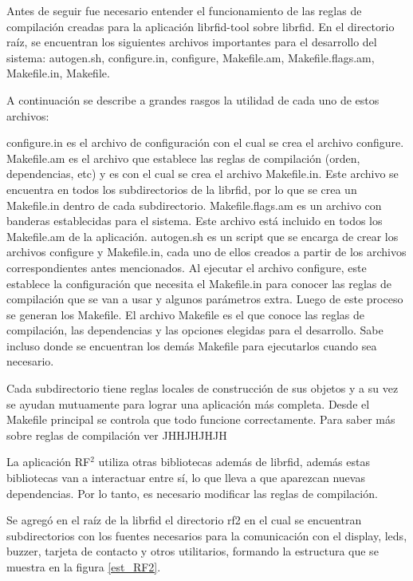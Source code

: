 \bigskip
Antes de seguir fue necesario entender el funcionamiento de las reglas de compilación creadas para la aplicación librfid-tool sobre librfid. En el directorio raíz, se encuentran los siguientes archivos importantes para el desarrollo del sistema: autogen.sh, configure.in, configure, Makefile.am, Makefile.flags.am, Makefile.in, Makefile.

\bigskip
A continuación se describe a grandes rasgos la utilidad de cada uno de estos archivos:

\bigskip
configure.in es el archivo de configuración con el cual se crea el archivo configure.
Makefile.am es el archivo que establece las reglas de compilación (orden, dependencias, etc) y es con el cual se crea el archivo Makefile.in. Este archivo se encuentra en todos los subdirectorios de la librfid, por lo que se crea un Makefile.in dentro de cada subdirectorio.
Makefile.flags.am es un archivo con banderas establecidas para el sistema. Este archivo está incluido en todos los Makefile.am de la aplicación.
autogen.sh es un script que se encarga de crear los archivos configure y Makefile.in, cada uno de ellos creados a partir de los archivos correspondientes antes mencionados.
Al ejecutar el archivo configure, este establece la configuración que necesita el Makefile.in para conocer las reglas de compilación que se van a usar y algunos parámetros extra. Luego de este proceso se generan los Makefile.
El archivo Makefile es el que conoce las reglas de compilación, las dependencias y las opciones elegidas para el desarrollo. Sabe incluso donde se encuentran los demás Makefile para ejecutarlos cuando sea necesario.

\bigskip
Cada subdirectorio tiene reglas locales de construcción de sus objetos y a su vez se ayudan mutuamente para lograr una aplicación más completa. Desde el Makefile principal se controla que todo funcione correctamente.
Para saber más sobre reglas de compilación ver JHHJHJHJH

\bigskip
La aplicación RF$^{2}$ utiliza otras bibliotecas además de librfid, además estas bibliotecas van a interactuar entre sí, lo que lleva a que aparezcan nuevas dependencias. Por lo tanto, es necesario modificar las reglas de compilación.

\bigskip
Se agregó en el raíz de la librfid el directorio rf2 en el cual se encuentran subdirectorios con los fuentes necesarios para la comunicación con el display, leds, buzzer, tarjeta de contacto y otros utilitarios, formando la estructura que se muestra en la figura \ref{est_RF2}. 


